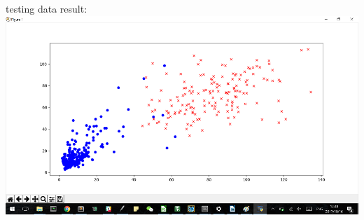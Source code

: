 \documentclass[12pt]{article}
\begin{document}
testing data result:\\
\includegraphics[scale=0.8]{test1_5}\\
\end{document}
